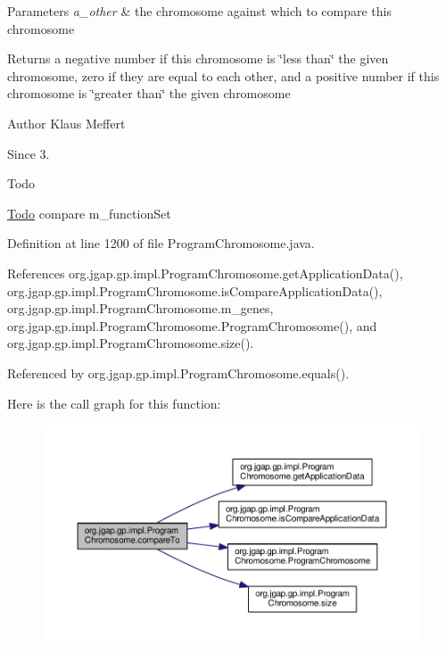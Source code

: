 \begin{DoxyParams}{Parameters}
{\em a\-\_\-other} & the chromosome against which to compare this chromosome \\
\hline
\end{DoxyParams}
\begin{DoxyReturn}{Returns}
a negative number if this chromosome is \char`\"{}less than\char`\"{} the given chromosome, zero if they are equal to each other, and a positive number if this chromosome is \char`\"{}greater than\char`\"{} the given chromosome
\end{DoxyReturn}
\begin{DoxyAuthor}{Author}
Klaus Meffert 
\end{DoxyAuthor}
\begin{DoxySince}{Since}
3. 
\end{DoxySince}
\begin{DoxyRefDesc}{Todo}
\item[\hyperlink{todo__todo000158}{Todo}]compare m\-\_\-function\-Set \end{DoxyRefDesc}


Definition at line 1200 of file Program\-Chromosome.\-java.



References org.\-jgap.\-gp.\-impl.\-Program\-Chromosome.\-get\-Application\-Data(), org.\-jgap.\-gp.\-impl.\-Program\-Chromosome.\-is\-Compare\-Application\-Data(), org.\-jgap.\-gp.\-impl.\-Program\-Chromosome.\-m\-\_\-genes, org.\-jgap.\-gp.\-impl.\-Program\-Chromosome.\-Program\-Chromosome(), and org.\-jgap.\-gp.\-impl.\-Program\-Chromosome.\-size().



Referenced by org.\-jgap.\-gp.\-impl.\-Program\-Chromosome.\-equals().



Here is the call graph for this function\-:
\nopagebreak
\begin{figure}[H]
\begin{center}
\leavevmode
\includegraphics[width=350pt]{classorg_1_1jgap_1_1gp_1_1impl_1_1_program_chromosome_ac9896e142c28c71711133698041fb72f_cgraph}
\end{center}
\end{figure}


